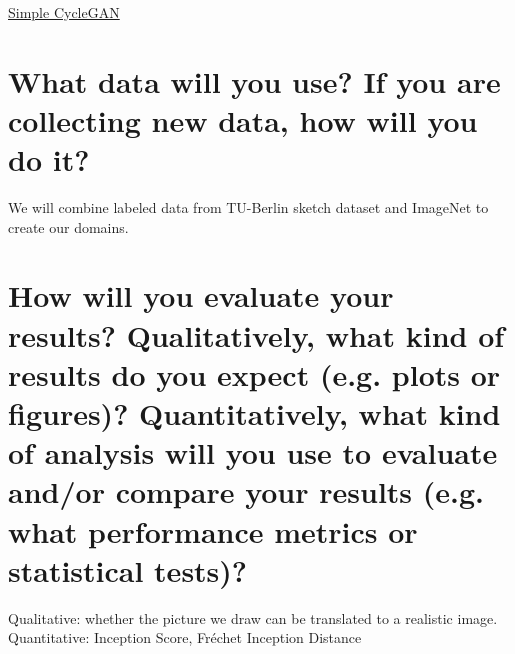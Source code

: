 \documentclass{article}
\begin{document}
\href{https://github.com/yunjey/mnist-svhn-transfer}{Simple CycleGAN} \\

\section{What data will you use? If you are collecting new data, how will you do it?}

We will combine labeled data from TU-Berlin sketch dataset \cite{tu-berlin-sketch} and ImageNet \cite{imagenet} to create our domains. 

\section{How will you evaluate your results? Qualitatively, what kind of results do you expect (e.g. plots or figures)? Quantitatively, what kind of analysis will you use to evaluate and/or compare your results (e.g. what performance metrics or statistical tests)? }

Qualitative: whether the picture we draw can be translated to a realistic image. \\
Quantitative: Inception Score, Fr\'echet Inception Distance



\end{document}

